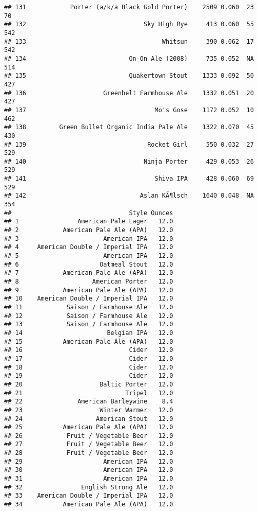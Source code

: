 \documentclass[
]{article}
\begin{document}
\begin{verbatim}
## 131            Porter (a/k/a Black Gold Porter)    2509 0.060  23         70
## 132                                Sky High Rye     413 0.060  55        542
## 133                                     Whitsun     390 0.062  17        542
## 134                            On-On Ale (2008)     735 0.052  NA        514
## 135                            Quakertown Stout    1333 0.092  50        427
## 136                     Greenbelt Farmhouse Ale    1332 0.051  20        427
## 137                                   Mo's Gose    1172 0.052  10        462
## 138         Green Bullet Organic India Pale Ale    1322 0.070  45        430
## 139                                 Rocket Girl     550 0.032  27        529
## 140                                Ninja Porter     429 0.053  26        529
## 141                                   Shiva IPA     428 0.060  69        529
## 142                               Aslan KÃ¶lsch    1640 0.048  NA        354
##                                Style Ounces
## 1                American Pale Lager   12.0
## 2            American Pale Ale (APA)   12.0
## 3                       American IPA   12.0
## 4     American Double / Imperial IPA   12.0
## 5                       American IPA   12.0
## 6                      Oatmeal Stout   12.0
## 7            American Pale Ale (APA)   12.0
## 8                    American Porter   12.0
## 9            American Pale Ale (APA)   12.0
## 10    American Double / Imperial IPA   12.0
## 11            Saison / Farmhouse Ale   12.0
## 12            Saison / Farmhouse Ale   12.0
## 13            Saison / Farmhouse Ale   12.0
## 14                       Belgian IPA   12.0
## 15           American Pale Ale (APA)   12.0
## 16                             Cider   12.0
## 17                             Cider   12.0
## 18                             Cider   12.0
## 19                             Cider   12.0
## 20                     Baltic Porter   12.0
## 21                            Tripel   12.0
## 22               American Barleywine    8.4
## 23                     Winter Warmer   12.0
## 24                    American Stout   12.0
## 25           American Pale Ale (APA)   12.0
## 26            Fruit / Vegetable Beer   12.0
## 27            Fruit / Vegetable Beer   12.0
## 28            Fruit / Vegetable Beer   12.0
## 29                      American IPA   12.0
## 30                      American IPA   12.0
## 31                      American IPA   12.0
## 32                English Strong Ale   12.0
## 33    American Double / Imperial IPA   12.0
## 34           American Pale Ale (APA)   12.0

\end{verbatim}
\end{document}
